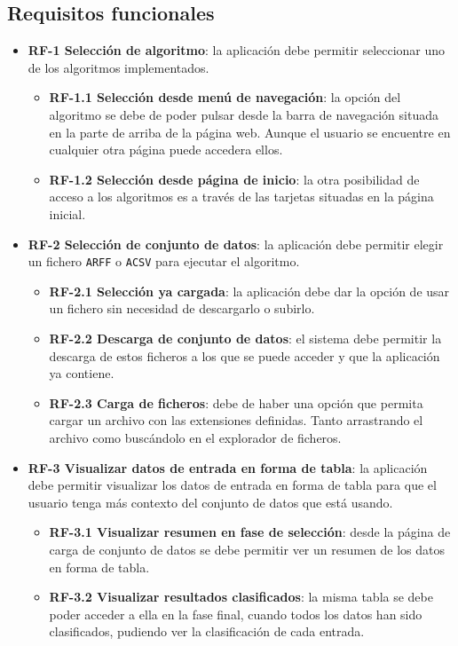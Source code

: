 \subsection{Requisitos funcionales}

\begin{itemize}
	\item \textbf{RF-1 Selección de algoritmo}: la aplicación debe
	permitir seleccionar uno de los algoritmos implementados.
	\begin{itemize}
		\item \textbf{RF-1.1 Selección desde menú de navegación}: la opción del algoritmo se debe de poder pulsar desde la barra de navegación situada en la parte de arriba de la página web. Aunque el usuario se encuentre en cualquier otra página puede accedera ellos.
		\item \textbf{RF-1.2 Selección desde página de inicio}: la otra posibilidad de acceso a los algoritmos es a través de las tarjetas situadas en la página inicial.
	\end{itemize}
	\item \textbf{RF-2 Selección de conjunto de datos}: la aplicación debe
	permitir elegir un fichero \texttt{ARFF} o \texttt{ACSV} para ejecutar el algoritmo.
	\begin{itemize}
		\item \textbf{RF-2.1 Selección ya cargada}: la aplicación debe dar la opción de usar un fichero sin necesidad de descargarlo o subirlo.
		\item \textbf{RF-2.2 Descarga de conjunto de datos}: el sistema debe permitir la descarga de estos ficheros a los que se puede acceder y que la aplicación ya contiene.
		\item \textbf{RF-2.3 Carga de ficheros}: debe de haber una opción que permita cargar un archivo con las extensiones definidas. Tanto arrastrando el archivo como buscándolo en el explorador de ficheros.
	\end{itemize} 
	\item \textbf{RF-3 Visualizar datos de entrada en forma de tabla}: la aplicación debe permitir visualizar los datos de entrada en forma de tabla para que el usuario tenga más contexto del conjunto de datos que está usando.
\begin{itemize}
	\item \textbf{RF-3.1 Visualizar resumen en fase de selección}: desde la página de carga de conjunto de datos se debe permitir ver un resumen de los datos en forma de tabla.
	\item \textbf{RF-3.2 Visualizar resultados clasificados}: la misma tabla se debe poder acceder a ella en la fase final, cuando todos los datos han sido clasificados, pudiendo ver la clasificación de cada entrada.

\end{itemize}
\end{itemize}
